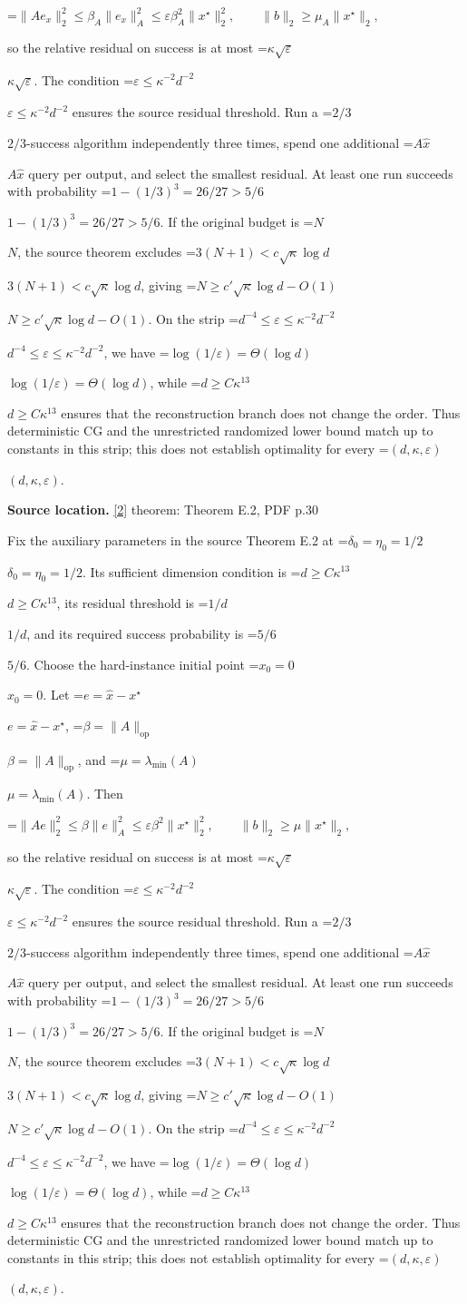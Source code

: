 \documentclass[10pt,a4paper]{article}
\newcommand{\AtlasMath}[1]{\par\begingroup\centering\setbox0=\hbox{$\displaystyle #1$}\ifdim\wd0>1.4\linewidth\typeout{ATLAS WIDE FORMULA: \the\wd0}\fi\ifdim\wd0>\linewidth\resizebox{\linewidth}{!}{\box0}\else\box0\fi\par\endgroup}
\newcommand{\AtlasInlineMath}[1]{\begingroup\setbox0=\hbox{$#1$}\ifdim\wd0>.4\linewidth\endgroup\AtlasMath{#1}\else\endgroup$#1$\fi}
\begin{document}
\AtlasMath{\|Ae_x\|_2^2\le\beta_A\|e_x\|_A^2\le\varepsilon\beta_A^2\|x^\star\|_2^2,\qquad \|b\|_2\ge\mu_A\|x^\star\|_2,}

so the relative residual on success is at most \AtlasInlineMath{\kappa\sqrt\varepsilon}. The condition \AtlasInlineMath{\varepsilon\le\kappa^{-2}d^{-2}} ensures the source residual threshold. Run a \AtlasInlineMath{2/3}-success algorithm independently three times, spend one additional \AtlasInlineMath{A\widehat x} query per output, and select the smallest residual. At least one run succeeds with probability \AtlasInlineMath{1-(1/3)^3=26/27>5/6}. If the original budget is \AtlasInlineMath{N}, the source theorem excludes \AtlasInlineMath{3(N+1)<c\sqrt\kappa\log d}, giving \AtlasInlineMath{N\ge c'\sqrt\kappa\log d-O(1)}. On the strip \AtlasInlineMath{d^{-4}\le\varepsilon\le\kappa^{-2}d^{-2}}, we have \AtlasInlineMath{\log(1/\varepsilon)=\Theta(\log d)}, while \AtlasInlineMath{d\ge C\kappa^{13}} ensures that the reconstruction branch does not change the order. Thus deterministic CG and the unrestricted randomized lower bound match up to constants in this strip; this does not establish optimality for every \AtlasInlineMath{(d,\kappa,\varepsilon)}.

\textbf{Source location.} \href{https://proceedings.mlr.press/v336/derezinski26a.html}{[2]} theorem: Theorem E.2, PDF p.30

Fix the auxiliary parameters in the source Theorem E.2 at \AtlasInlineMath{\delta_0=\eta_0=1/2}. Its sufficient dimension condition is \AtlasInlineMath{d\ge C\kappa^{13}}, its residual threshold is \AtlasInlineMath{1/d}, and its required success probability is \AtlasInlineMath{5/6}. Choose the hard-instance initial point \AtlasInlineMath{x_0=0}. Let \AtlasInlineMath{e=\widehat x-x^\star}, \AtlasInlineMath{\beta=\|A\|_{\mathrm{op}}}, and \AtlasInlineMath{\mu=\lambda_{\min}(A)}. Then

\AtlasMath{\|Ae\|_2^2\le\beta\|e\|_A^2\le\varepsilon\beta^2\|x^\star\|_2^2,\qquad \|b\|_2\ge\mu\|x^\star\|_2,}

so the relative residual on success is at most \AtlasInlineMath{\kappa\sqrt\varepsilon}. The condition \AtlasInlineMath{\varepsilon\le\kappa^{-2}d^{-2}} ensures the source residual threshold. Run a \AtlasInlineMath{2/3}-success algorithm independently three times, spend one additional \AtlasInlineMath{A\widehat x} query per output, and select the smallest residual. At least one run succeeds with probability \AtlasInlineMath{1-(1/3)^3=26/27>5/6}. If the original budget is \AtlasInlineMath{N}, the source theorem excludes \AtlasInlineMath{3(N+1)<c\sqrt\kappa\log d}, giving \AtlasInlineMath{N\ge c'\sqrt\kappa\log d-O(1)}. On the strip \AtlasInlineMath{d^{-4}\le\varepsilon\le\kappa^{-2}d^{-2}}, we have \AtlasInlineMath{\log(1/\varepsilon)=\Theta(\log d)}, while \AtlasInlineMath{d\ge C\kappa^{13}} ensures that the reconstruction branch does not change the order. Thus deterministic CG and the unrestricted randomized lower bound match up to constants in this strip; this does not establish optimality for every \AtlasInlineMath{(d,\kappa,\varepsilon)}.
\end{document}
